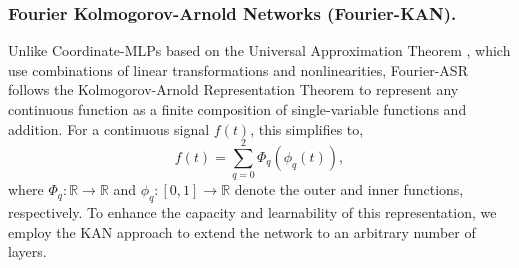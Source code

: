 \documentclass[letterpaper]{article} %
\newtheorem{theorem}{Theorem}
\newtheorem{assumption}{Assumption}
\begin{document}
\subsubsection{Fourier Kolmogorov-Arnold Networks (Fourier-KAN).}
Unlike Coordinate-MLPs based on the Universal Approximation Theorem \cite{HORNIK1989359}, which use combinations of linear transformations and nonlinearities, Fourier-ASR follows the Kolmogorov-Arnold Representation Theorem \cite{Kolmogorov1956, Arnold1957} to represent any continuous function as a finite composition of single-variable functions and addition. For a continuous signal \( f(t) \), this simplifies to,
\begin{equation}
    f({t}) = \sum_{q=0}^{2} \Phi_q \left(\phi_{q}(t) \right),
\end{equation}
where \(\Phi_q: \mathbb{R} \rightarrow \mathbb{R}\) and \(\phi_{q}: [0,1] \rightarrow \mathbb{R}\) denote the outer and inner functions, respectively.
To enhance the capacity and learnability of this representation, we employ the KAN \cite{liu2024kan} approach to extend the network to an arbitrary number of layers.

\begin{table}[!ht]
    \centering
\end{table}
\end{document}
